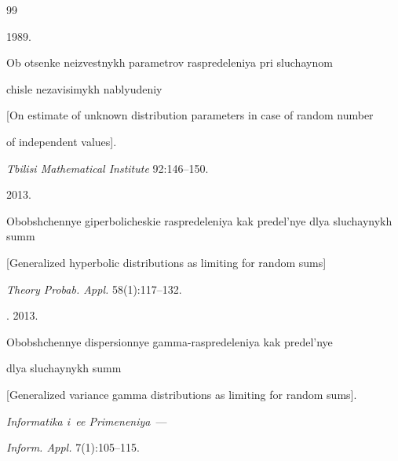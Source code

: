 {\small\frenchspacing


{%




\begin{thebibliography}{99}





\vspace*{-6pt}










 1989.


Ob otsenke neizvestnykh parametrov raspredeleniya pri sluchaynom


chisle nezavisimykh nablyudeniy


[On estimate of unknown distribution parameters in case of random number


of independent values].


\textit{Tbilisi Mathematical Institute} 92:146--150.







 2013.


Obobshchennye giperbolicheskie raspredeleniya kak predel'nye dlya sluchaynykh summ


[Generalized hyperbolic distributions as limiting for random sums]


\textit{Theory Probab. Appl.} 58(1):117--132.










. 2013.


Obobshchennye dispersionnye gamma-raspredeleniya kak predel'nye


dlya sluchaynykh summ


[Generalized variance gamma distributions as limiting for random sums].


\textit{Informatika i~ee Primeneniya}~---


\textit{Inform. Appl.} 7(1):105--115.






\end{thebibliography}}}
